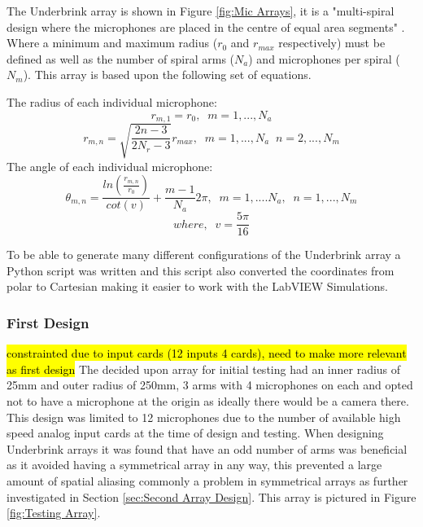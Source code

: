 \documentclass{UoNMCHA}
\numberwithin{equation}{section}
\begin{document}
    The Underbrink array is shown in Figure \ref{fig:Mic Arrays}, it is a "multi-spiral design where the microphones are placed in the centre of equal area segments" \citep{Pri13}. Where a minimum and maximum radius ($r_0$ and $r_{max}$ respectively) must be defined as well as the number of spiral arms ($N_a$) and microphones per spiral ($N_m$). This array is based upon the following set of equations.
    
    The radius of each individual microphone:
    \begin{equation}
        r_{m,1} = r_0,\;\;m=1,...,N_a
    \end{equation}
    \begin{equation*}
        r_{m,n}=\sqrt{\frac{2n-3}{2N_r-3}}r_{max},\;\;m=1,...,N_a\;\;n=2,...,N_m
    \end{equation*}
    The angle of each individual microphone:
    \begin{equation}
        \theta_{m,n} = \frac{ln(\frac{r_{m,n}}{r_0})}{cot(v)} + \frac{m-1}{N_a}2\pi,\;\;m=1,....N_a,\;\;n=1,...,N_m
    \end{equation}
    \begin{equation*}
        where,\;\;v=\frac{5\pi}{16}
    \end{equation*}
    
    To be able to generate many different configurations of the Underbrink array a Python script was written and this script also converted the coordinates from polar to Cartesian making it easier to work with the LabVIEW Simulations.
\subsubsection{First Design} \label{sec:First Array Design}
    \hl{constrainted due to input cards (12 inputs 4 cards), need to make more relevant as first design}
    The decided upon array for initial testing had an inner radius of 25mm and outer radius of 250mm, 3 arms with 4 microphones on each and opted not to have a microphone at the origin as ideally there would be a camera there. This design was limited to 12 microphones due to the number of available high speed analog input cards at the time of design and testing. When designing Underbrink arrays it was found that have an odd number of arms was beneficial as it avoided having a symmetrical array in any way, this prevented a large amount of spatial aliasing commonly a problem in symmetrical arrays as further investigated in Section \ref{sec:Second Array Design}. This array is pictured in Figure \ref{fig:Testing Array}.
    
\end{document}
